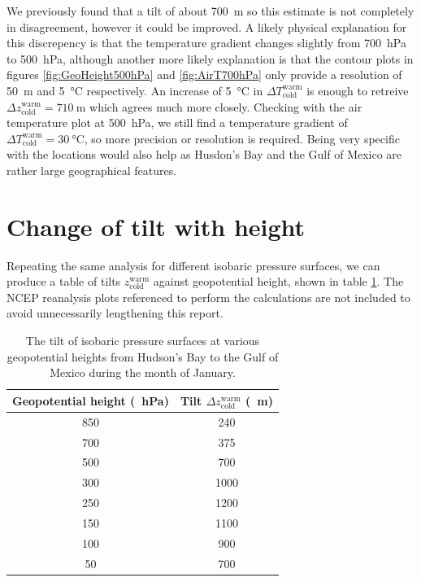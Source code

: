 \documentclass[11pt]{article}
\begin{document}
We previously found that a tilt of about \SI{700}{\m} so this estimate is not completely in disagreement, however it could be improved. A likely physical explanation for this discrepency is that the temperature gradient changes slightly from \SI{700}{\hecto\Pa} to \SI{500}{\hecto\Pa}, although another more likely explanation is that the contour plots in figures \ref{fig:GeoHeight500hPa} and \ref{fig:AirT700hPa} only provide a resolution of \SI{50}{\m} and \SI{5}{\degreeCelsius} respectively. An increase of \SI{5}{\degreeCelsius} in $\Delta T_\mathrm{cold}^\mathrm{warm}$ is enough to retreive $\Delta z_\mathrm{cold}^\mathrm{warm} = \SI{710}{\m}$ which agrees much more closely. Checking with the air temperature plot at \SI{500}{\hecto\Pa}, we still find a temperature gradient of $\Delta T_\mathrm{cold}^\mathrm{warm} = \SI{30}{\degreeCelsius}$, so more precision or resolution is required. Being very specific with the locations would also help as Husdon's Bay and the Gulf of Mexico are rather large geographical features.

\section{Change of tilt with height}
Repeating the same analysis for different isobaric pressure surfaces, we can produce a table of tilts $z_\mathrm{cold}^\mathrm{warm}$ against geopotential height, shown in table \ref{table:tilts}. The NCEP reanalysis plots referenced to perform the calculations are not included to avoid unnecessarily lengthening this report.

\begin{table}[!h]
  \begin{center}
    \begin{tabular}{cc}
      \toprule
      Geopotential height (\SI{}{\hecto\Pa}) & Tilt $\Delta z_\mathrm{cold}^\mathrm{warm}$ (\SI{}{\m}) \\
      \midrule
      850 & 240 \\
      700 & 375 \\
      500 & 700 \\
      300 & 1000 \\
      250 & 1200  \\
      150 & 1100 \\
      100 & 900 \\
      50  & 700 \\
      \bottomrule
    \end{tabular}
  \end{center}
  \caption{The tilt of isobaric pressure surfaces at various geopotential heights from Hudson's Bay to the Gulf of Mexico during the month of January.}
  \label{table:tilts}
\end{table}
\end{document}
